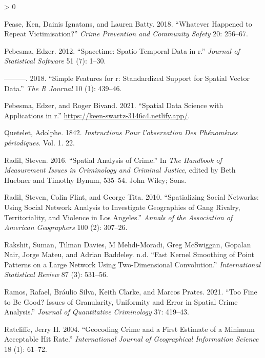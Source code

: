 \documentclass[
  krantz2]{krantz}
\newlength{\cslhangindent}
\newenvironment{CSLReferences}[2] %
 {%
  \setlength{\parindent}{0pt}
  \ifodd #1 \everypar{\setlength{\hangindent}{\cslhangindent}}\ignorespaces\fi
  \ifnum #2 > 0
  \setlength{\parskip}{#2\baselineskip}
  \fi
 }%
 {}
\begin{document}
\begin{CSLReferences}{1}{0}
\leavevmode\hypertarget{ref-Pease_2018}{}%
Pease, Ken, Dainis Ignatans, and Lauren Batty. 2018. {``Whatever Happened to Repeat Victimisation?''} \emph{Crime Prevention and Community Safety} 20: 256--67.

\leavevmode\hypertarget{ref-Pebesma_2012}{}%
Pebesma, Edzer. 2012. {``Spacetime: Spatio-Temporal Data in r.''} \emph{Journal of Statistical Software} 51 (7): 1--30.

\leavevmode\hypertarget{ref-Pebesma_2018}{}%
---------. 2018. {``Simple Features for r: Standardized Support for Spatial Vector Data.''} \emph{The R Journal} 10 (1): 439--46.

\leavevmode\hypertarget{ref-Pebesma_2021}{}%
Pebesma, Edzer, and Roger Bivand. 2021. {``Spatial Data Science with Applications in r.''} \url{https://keen-swartz-3146c4.netlify.app/}.

\leavevmode\hypertarget{ref-Quetelet_1842}{}%
Quetelet, Adolphe. 1842. \emph{Instructions Pour l'observation Des Ph{é}nom{è}nes p{é}riodiques}. Vol. 1. 22.

\leavevmode\hypertarget{ref-Radil_2016}{}%
Radil, Steven. 2016. {``Spatial Analysis of Crime.''} In \emph{The Handbook of Measurement Issues in Criminology and Criminal Justice}, edited by Beth Huebner and Timothy Bynum, 535--54. John Wiley; Sons.

\leavevmode\hypertarget{ref-Radil_2010}{}%
Radil, Steven, Colin Flint, and George Tita. 2010. {``Spatializing Social Networks: Using Social Network Analysis to Investigate Geographies of Gang Rivalry, Territoriality, and Violence in Los Angeles.''} \emph{Annals of the Association of American Geographers} 100 (2): 307--26.

\leavevmode\hypertarget{ref-Rakshit_2019}{}%
Rakshit, Suman, Tilman Davies, M Mehdi-Moradi, Greg McSwiggan, Gopalan Nair, Jorge Mateu, and Adrian Baddeley. n.d. {``Fast Kernel Smoothing of Point Patterns on a Large Network Using Two-Dimensional Convolution.''} \emph{International Statistical Review} 87 (3): 531--56.

\leavevmode\hypertarget{ref-Ramos_2021}{}%
Ramos, Rafael, Bráulio Silva, Keith Clarke, and Marcos Prates. 2021. {``Too Fine to Be Good? Issues of Granularity, Uniformity and Error in Spatial Crime Analysis.''} \emph{Journal of Quantitative Criminology} 37: 419--43.

\leavevmode\hypertarget{ref-Ratcliffe_2004}{}%
Ratcliffe, Jerry H. 2004. {``Geocoding Crime and a First Estimate of a Minimum Acceptable Hit Rate.''} \emph{International Journal of Geographical Information Science} 18 (1): 61--72.


\end{CSLReferences}
\end{document}
